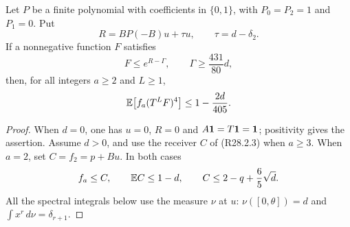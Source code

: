 \begin{lemma}
\label{lem:R28:global-mask}
Let \(P\) be a finite polynomial with coefficients in \(\{0,1\}\),
with \(P_0=P_2=1\) and \(P_1=0\). Put
\[
 R=BP(-B)u+\tau u,\qquad \tau=d-\delta_2.
\]
If a nonnegative function \(F\) satisfies
\[
 F\le e^{R-\Gamma},\qquad \Gamma\ge \frac{431}{80}d,
\]
then, for all integers \(a\ge2\) and \(L\ge1\),
\begin{equation}\label{eq:R28:global-mask-conclusion}
 \mathbb E\!\left[f_a(T^LF)^4\right]\le1-\frac{2d}{405}.
\end{equation}
\end{lemma}

\begin{proof}
When \(d=0\), one has \(u=0\), \(R=0\) and \(A\mathbf1=T\mathbf1=\mathbf1\);
positivity gives the assertion. Assume \(d>0\), and use the
receiver \(C\) of (R28.2.3) when \(a\ge3\).
When \(a=2\), set \(C=f_2=p+Bu\).
In both cases
\[
 f_a\le C,\qquad \mathbb E C\le1-d,\qquad C\le2-q+\frac65\sqrt d.
\]
All the spectral integrals below use the measure \(\nu\) at \(u\):
\(\nu([0,\theta])=d\) and \(\int x^r\,d\nu=\delta_{r+1}\).


\end{proof}
